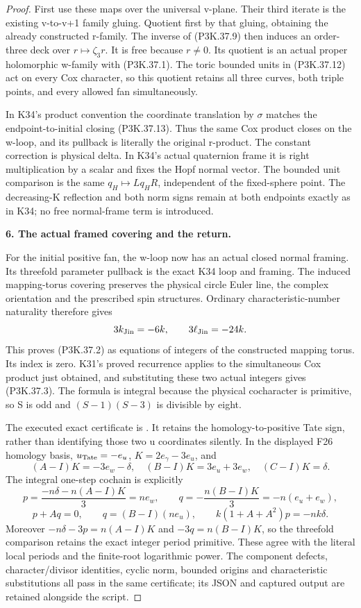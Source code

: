 \begin{proof}
First use these maps over the universal v-plane. Their third iterate is
the existing v-to-v+1 family gluing. Quotient first by that gluing, obtaining
the already constructed r-family. The inverse of (P3K.37.9) then induces an
order-three deck over \(r\mapsto\zeta_3r\). It is free because
\(r\ne0\). Its quotient is an actual proper holomorphic w-family with
(P3K.37.1). The toric bounded units in (P3K.37.12) act on every Cox character,
so this quotient retains all three curves, both triple points, and every
allowed fan simultaneously.

In K34's product convention the coordinate translation by \(\sigma\)
matches the endpoint-to-initial closing (P3K.37.13). Thus the same Cox product
closes on the w-loop, and its pullback is literally the original r-product.
The constant correction is physical delta. In K34's actual quaternion frame
it is right multiplication by a scalar and fixes the Hopf normal vector.
The bounded unit comparison is the same \(q_H\mapsto Lq_HR\),
independent of the fixed-sphere point. The decreasing-K reflection and both
norm signs remain at both endpoints exactly as in K34; no free normal-frame
term is introduced.

\par\medskip\noindent\textbf{6. The actual framed covering and the return.}\enspace

For the initial positive fan, the w-loop now has an actual closed normal
framing. Its threefold parameter pullback is the exact K34 loop and framing.
The induced mapping-torus covering preserves the physical circle Euler line,
the complex orientation and the prescribed spin structures. Ordinary
characteristic-number naturality therefore gives
\[
 3k_{\rm Jin}=-6k,\qquad 3\ell_{\rm Jin}=-24k.
\]
This proves (P3K.37.2) as equations of integers of the constructed mapping torus.
Its index is zero. K31's proved recurrence applies to the simultaneous Cox
product just obtained, and substituting these two actual integers gives
(P3K.37.3). The formula is integral because the physical cocharacter is primitive,
so S is odd and \((S-1)(S-3)\) is divisible by eight.

The executed exact certificate is
. It retains the homology-to-positive
Tate sign, rather than identifying those two u coordinates silently. In the
displayed F26 homology basis,
\(u_{\rm Tate}=-e_u\), \(K=2e_\gamma-3e_u\), and
\[
 (A-I)K=-3e_w-\delta,\quad
 (B-I)K=3e_u+3e_w,\quad (C-I)K=\delta.
\]
The integral one-step cochain is explicitly
\[
 p=\frac{-n\delta-n(A-I)K}{3}=ne_w,\qquad
 q=-\frac{n(B-I)K}{3}=-n(e_u+e_w),
\]
\[
 p+Aq=0,\qquad q=(B-I)(ne_u),\qquad
 k(1+A+A^2)p=-nk\delta.
\]
Moreover \(-n\delta-3p=n(A-I)K\) and \(-3q=n(B-I)K\),
so the threefold comparison retains the exact integer period primitive.
These agree with the literal local periods and the finite-root logarithmic
power. The component defects, character/divisor identities, cyclic norm,
bounded origins and characteristic substitutions all pass in the same
certificate; its JSON and captured output are retained alongside the script.


\end{proof}
